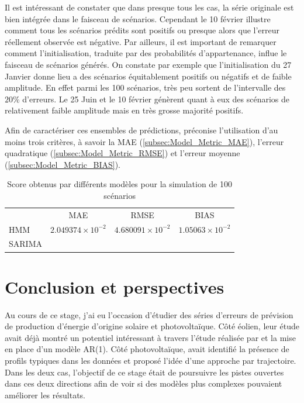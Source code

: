\documentclass[12pt]{report}
\begin{document}
Il est intéressant de constater que dans presque tous les cas, la série originale est bien intégrée dans le faisceau de scénarios. Cependant le 10 février illustre comment tous les scénarios prédits sont positifs ou presque alors que l'erreur réellement observée est négative. Par ailleurs, il est important de remarquer comment l'initialisation, traduite par des probabilités d'appartenance, influe le faisceau de scénarios générés. On constate par exemple que l'initialisation du 27 Janvier donne lieu a des scénarios équitablement positifs ou négatifs et de faible amplitude. En effet parmi les 100 scénarios, très peu sortent de l'intervalle des $20\%$ d'erreurs. Le 25 Juin et le 10 février génèrent quant à eux des scénarios de relativement faible amplitude mais en très grosse majorité positifs.

Afin de caractériser ces ensembles de prédictions, \cite{madsen_protocol_nodate} préconise l'utilisation d'au moins trois critères, à savoir la MAE (\ref{subsec:Model_Metric_MAE}), l'erreur quadratique (\ref{subsec:Model_Metric_RMSE}) et l'erreur moyenne (\ref{subsec:Model_Metric_BIAS}).


\begin{table}[h]
\centering
\caption{Score obtenus par différents modèles pour la simulation de 100 scénarios}
\begin{tabular}{lccc}
	& MAE  & RMSE & BIAS \\
HMM	& $2.049374 \times 10^{-2}$ & $4.680091\times 10^{-2}$ & $1.05063 \times 10^{-2}$	    \\
SARIMA	&  &  & 
\end{tabular}
\end{table}

   

\chapter{Conclusion et perspectives}
Au cours de ce stage, j'ai eu l'occasion d'étudier des séries d'erreurs de prévision de production d'énergie d'origine solaire et photovoltaïque. Côté éolien, leur étude avait déjà montré un potentiel intéressant à travers l'étude réalisée par \cite{haessig_dimensionnement_2014} et la mise en place d'un modèle AR(1). Côté photovoltaïque, \cite{latimier_gestion_2016} avait identifié la présence de profils typiques dans les données et proposé l'idée d'une approche par trajectoire. Dans les deux cas, l'objectif de ce stage était de poursuivre les pistes ouvertes dans ces deux directions afin de voir si des modèles plus complexes pouvaient améliorer les résultats.
\end{document}
